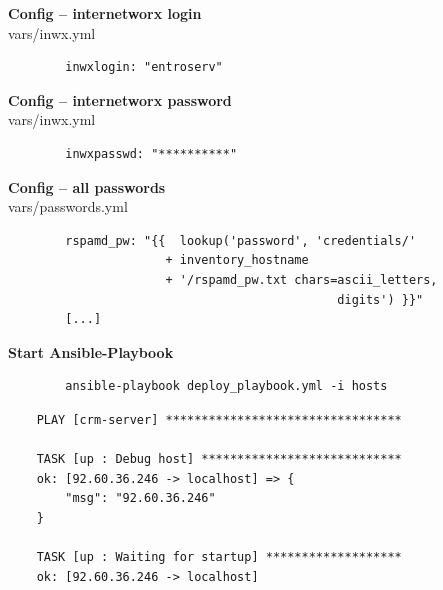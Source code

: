 \documentclass{beamer}
\begin{document}
\begin{frame}[fragile]{\insertsection}{\insertsubsection}
	\vspace{-0.5cm}
	\textbf{Config -- internetworx login}\\
	vars/inwx.yml
	\begin{verbatim}
		inwxlogin: "entroserv"
	\end{verbatim}
	
	\textbf{Config -- internetworx password}\\
	vars/inwx.yml
	\begin{verbatim}
		inwxpasswd: "**********"
	\end{verbatim}
\end{frame}	

\begin{frame}[fragile]{\insertsection}{\insertsubsection}
	\vspace{-0.5cm}
	\textbf{Config -- all passwords}\\
	vars/passwords.yml
	\begin{verbatim}
		rspamd_pw: "{{  lookup('password', 'credentials/'
		              + inventory_hostname
		              + '/rspamd_pw.txt chars=ascii_letters,
		                                      digits') }}"
		[...]
	\end{verbatim}
\end{frame}	

\begin{frame}[fragile]{\insertsection}{\insertsubsection}
	\vspace{-0.5cm}
	\textbf{Start Ansible-Playbook}\\
	\begin{verbatim}
		ansible-playbook deploy_playbook.yml -i hosts
	\end{verbatim}
	
	\begin{verbatim}
	PLAY [crm-server] *********************************
	
	TASK [up : Debug host] ****************************
	ok: [92.60.36.246 -> localhost] => {
	    "msg": "92.60.36.246"
	}
	
	TASK [up : Waiting for startup] *******************
	ok: [92.60.36.246 -> localhost]
	\end{verbatim}
\end{frame}
\end{document}
